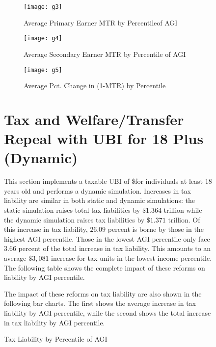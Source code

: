 \documentclass{article}
\begin{document}
\begin{figure}[H]
\begin{figure}[H]
\centering
\caption{Average Primary Earner MTR by Percentileof AGI}
\texttt{[image: g3]}
\end{figure}

\begin{figure}[H]
\centering
\caption{Average Secondary Earner MTR by Percentile of AGI}
\texttt{[image: g4]}
\end{figure}

\begin{figure}[H]
\centering
\caption{Average Pct. Change in (1-MTR) by Percentile}
\texttt{[image: g5]}
\end{figure}

\section{Tax and Welfare/Transfer Repeal with UBI for 18 Plus (Dynamic)}
This section implements a taxable UBI of \$\hxaa{}for individuals at least $18$ years old and performs a dynamic simulation. Increases in tax liability are similar in both static and dynamic simulations: the static simulation raises total tax liabilities by $\$1.364$ trillion while the dynamic simulation raises tax liabilities by $\$1.371$ trillion. Of this increase in tax liability, $26.09$ percent is borne by those in the highest AGI percentile. Those in the lowest AGI percentile only face $3.66$ percent of the total increase in tax liability. This amounts to an average $\$3,081$ increase for tax units in the lowest income percentile. The following table shows the complete impact of these reforms on liability by AGI percentile.

\begin{table}[H]
\caption{Tax Liability by Percentile of AGI}
\begin{center}
\begin{adjustbox}{max width=\textwidth}

\end{adjustbox}
\end{center}
\end{table}

The impact of these reforms on tax liability are also shown in the following bar charts. The first shows the average increase in tax liability by AGI percentile, while the second shows the total increase in tax liability by AGI percentile.


\end{figure}
\end{document}
